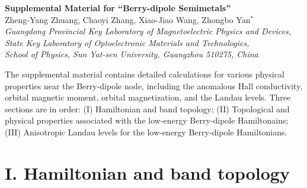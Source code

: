 \documentclass[aps,prl,twocolumn,longbibliography]{revtex4-1}
\begin{document}
\begin{widetext}
\clearpage
\begin{center}
\textbf{\large Supplemental Material for ``Berry-dipole Semimetals''}\\
\vspace{4mm}
{Zheng-Yang Zhuang, Chaoyi Zhang, Xiao-Jiao Wang, Zhongbo Yan$^{*}$}\\
\vspace{2mm}
{\em Guangdong Provincial Key Laboratory of Magnetoelectric Physics and Devices, \\State Key Laboratory of Optoelectronic Materials and Technologies,\\School of Physics, Sun Yat-sen University, Guangzhou 510275, China}\\
\end{center}

\setcounter{equation}{0}
\setcounter{figure}{0}
\setcounter{table}{0}
\makeatletter
\renewcommand{\theequation}{S\arabic{equation}}
\renewcommand{\thefigure}{S\arabic{figure}}
\renewcommand{\bibnumfmt}[1]{[S#1]}

The supplemental material contains detailed calculations for various physical properties near the Berry-dipole node, including the anomalous Hall conductivity, orbital magnetic moment, orbital magnetization, and the Landau levels. Three sections are in order: (I) Hamiltonian and band topology; (II) Topological and physical properties associated with the low-energy Berry-dipole Hamiltonains; (III) Anisotropic Landau levels for the low-energy Berry-dipole Hamiltonians.

\section{I. Hamiltonian and band topology}




\end{widetext}
\end{document}
